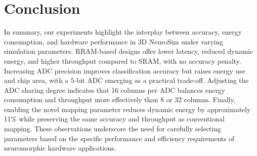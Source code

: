 \documentclass[11pt]{article}
\begin{document}
\section*{Conclusion}
In summary, our experiments highlight the interplay between accuracy, energy consumption, and hardware performance in 3D NeuroSim under varying simulation parameters. RRAM-based designs offer lower latency, reduced dynamic energy, and higher throughput compared to SRAM, with no accuracy penalty. Increasing ADC precision improves classification accuracy but raises energy use and chip area, with a 5-bit ADC emerging as a practical trade-off. Adjusting the ADC sharing degree indicates that 16 columns per ADC balances energy consumption and throughput more effectively than 8 or 32 columns. Finally, enabling the novel mapping parameter reduces dynamic energy by approximately 11\% while preserving the same accuracy and throughput as conventional mapping. These observations underscore the need for carefully selecting parameters based on the specific performance and efficiency requirements of neuromorphic hardware applications.

\nocite{*}


\end{document}
